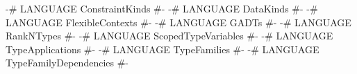 \begin{code}
{-# LANGUAGE ConstraintKinds        #-}
{-# LANGUAGE DataKinds              #-}
{-# LANGUAGE FlexibleContexts       #-}
{-# LANGUAGE GADTs                  #-}
{-# LANGUAGE RankNTypes             #-}
{-# LANGUAGE ScopedTypeVariables    #-}
{-# LANGUAGE TypeApplications       #-}
{-# LANGUAGE TypeFamilies           #-}
{-# LANGUAGE TypeFamilyDependencies #-}
\end{code}
